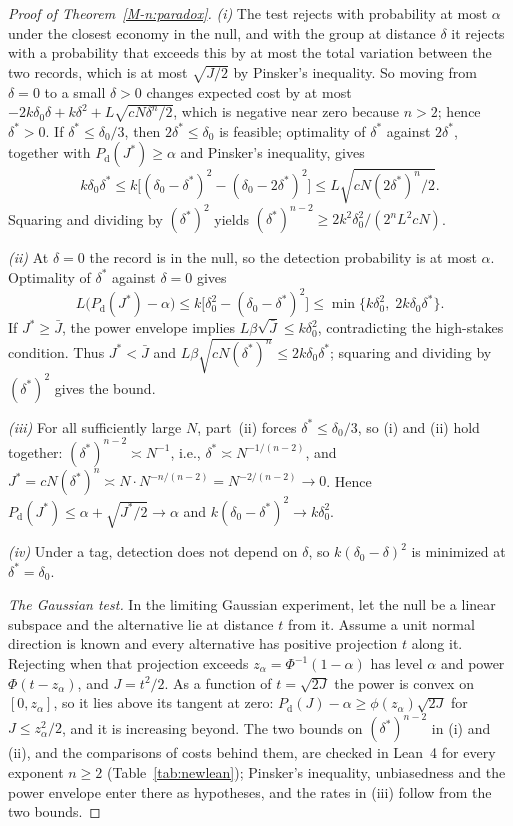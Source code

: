 \documentclass[12pt]{article}
\theoremstyle{definition}
\theoremstyle{remark}
\begin{document}
\begin{proof}[Proof of Theorem~\ref{M-n:paradox}]
\emph{(i)} The test rejects with probability at most $\alpha$ under the closest economy in the null, and with the group at distance $\delta$ it rejects with a probability that exceeds this by at most the total variation between the two records, which is at most $\sqrt{J/2}$ by Pinsker's inequality. So moving from $\delta = 0$ to a small $\delta > 0$ changes expected cost by at most $-2k\delta_0\delta + k\delta^2 + L\sqrt{cN\delta^n/2}$, which is negative near zero because $n > 2$; hence $\delta^* > 0$. If $\delta^* \le \delta_0/3$, then $2\delta^* \le \delta_0$ is feasible; optimality of $\delta^*$ against $2\delta^*$, together with $P_{\mathrm{d}}(J^*) \ge \alpha$ and Pinsker's inequality, gives
\[
  k\delta_0\delta^* \le k\bigl[(\delta_0 - \delta^*)^2 - (\delta_0 - 2\delta^*)^2\bigr] \le L\sqrt{cN(2\delta^*)^n/2}.
\]
Squaring and dividing by $(\delta^*)^2$ yields $(\delta^*)^{n-2} \ge 2k^2\delta_0^2/(2^n L^2 cN)$.

\emph{(ii)} At $\delta = 0$ the record is in the null, so the detection probability is at most $\alpha$. Optimality of $\delta^*$ against $\delta = 0$ gives
\[
  L\bigl(P_{\mathrm{d}}(J^*) - \alpha\bigr) \le k\bigl[\delta_0^2 - (\delta_0 - \delta^*)^2\bigr] \le \min\{k\delta_0^2,\; 2k\delta_0\delta^*\}.
\]
If $J^* \ge \bar{J}$, the power envelope implies $L\beta\sqrt{\bar{J}} \le k\delta_0^2$, contradicting the high-stakes condition. Thus $J^* < \bar{J}$ and $L\beta\sqrt{cN(\delta^*)^n} \le 2k\delta_0\delta^*$; squaring and dividing by $(\delta^*)^2$ gives the bound.

\emph{(iii)} For all sufficiently large $N$, part~(ii) forces $\delta^* \le \delta_0/3$, so (i) and (ii) hold together: $(\delta^*)^{n-2} \asymp N^{-1}$, i.e., $\delta^* \asymp N^{-1/(n-2)}$, and $J^* = cN(\delta^*)^n \asymp N \cdot N^{-n/(n-2)} = N^{-2/(n-2)} \to 0$. Hence $P_{\mathrm{d}}(J^*) \le \alpha + \sqrt{J^*/2} \to \alpha$ and $k(\delta_0 - \delta^*)^2 \to k\delta_0^2$.

\emph{(iv)} Under a tag, detection does not depend on $\delta$, so $k(\delta_0 - \delta)^2$ is minimized at $\delta^* = \delta_0$.

\emph{The Gaussian test.} In the limiting Gaussian experiment, let the null be a linear subspace and the alternative lie at distance $t$ from it. Assume a unit normal direction is known and every alternative has positive projection $t$ along it. Rejecting when that projection exceeds $z_\alpha=\Phi^{-1}(1-\alpha)$ has level $\alpha$ and power $\Phi(t-z_\alpha)$, and $J = t^2/2$. As a function of $t = \sqrt{2J}$ the power is convex on $[0, z_\alpha]$, so it lies above its tangent at zero: $P_{\mathrm{d}}(J) - \alpha \ge \phi(z_\alpha)\sqrt{2J}$ for $J \le z_\alpha^2/2$, and it is increasing beyond. The two bounds on $(\delta^*)^{n-2}$ in (i) and (ii), and the comparisons of costs behind them, are checked in Lean~4 for every exponent $n \ge 2$ (Table~\ref{tab:newlean}); Pinsker's inequality, unbiasedness and the power envelope enter there as hypotheses, and the rates in (iii) follow from the two bounds.
\end{proof}
\end{document}
